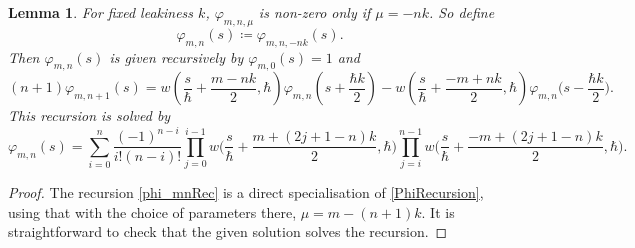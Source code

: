 \documentclass[10pt,a4paper,oneside,no-math,reqno]{amsart}%
\theoremstyle{plain}
\newtheorem{lemma}[theorem]{Lemma}
\theoremstyle{definition}
\theoremstyle{remark}
\numberwithin{equation}{section}
\renewcommand{\phi}{\varphi}
\newcommand{\mb}[1]{\mathbb{#1}}
\newcommand{\mc}[1]{\mathcal{#1}}
\newcommand{\1}{\mathds{1}}
\newcommand{\Z}{\mb{Z}}
\newcommand{\<}{\langle}
\renewcommand{\>}{\rangle}
\newcommand{\del}{\partial}
\DeclareMathOperator{\ad}{ad}
\begin{document}

\begin{lemma}
	For fixed leakiness $ k$, $ \phi_{m,n,\mu}$ is non-zero only if $ \mu = - nk$. So define
	\begin{equation}\label{phi_m}
		\phi_{m,n}(s)
		\coloneqq
		\phi_{m,n,-nk}(s) .
	\end{equation}
	Then $ \phi_{m,n}(s)$ is given recursively by $ \phi_{m,0}(s) = 1$ and
	\begin{equation}\label{phi_mnRec}
		(n+1) \phi_{m,n+1} (s) 
		=
		w (\frac{s}{\hbar} + \frac{m-nk}{2}, \hbar ) \phi_{m,n} ( s + \frac{\hbar k}{2}) - w ( \frac{s}{\hbar} + \frac{-m+nk}{2}, \hbar ) \phi_{m,n} \big( s - \frac{\hbar k}{2}\big) .
	\end{equation}
	This recursion is solved by
	\begin{equation}\label{phi_mn}
		\phi_{m,n} (s )
		=
		\sum_{i=0}^n \frac{(-1)^{n-i}}{i!(n-i)!} \prod_{j=0}^{i-1} w \big( \frac{s}{\hbar} + \frac{m + (2j+1-n)k}{2}, \hbar \big) \prod_{j=i}^{n-1} w \big( \frac{s}{\hbar} + \frac{-m + (2j+1-n)k}{2}, \hbar \big) .
\end{equation}
\end{lemma}

\begin{proof}
	The recursion \eqref{phi_mnRec} is a direct specialisation of \cref{PhiRecursion}, using that with the choice of parameters there, $ \mu = m - (n+1)k$. It is straightforward to check that the given solution solves the recursion.
\end{proof}
\end{document}
